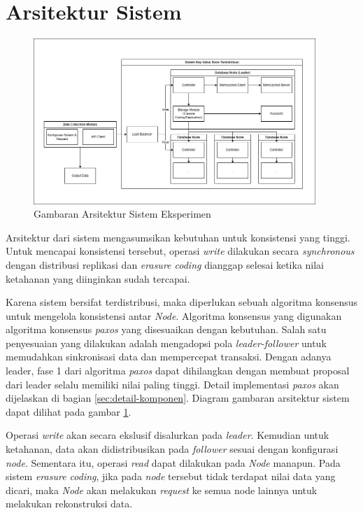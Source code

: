 \section{Arsitektur Sistem}
\label{sec:system-architecture}

\begin{figure}[ht]
    \centering
    \includegraphics[width=0.95\textwidth]{resources/chapter-3/general-architecture.png}
    \caption{Gambaran Arsitektur Sistem Eksperimen}
    \label{fig:general-architecture}
\end{figure}

Arsitektur dari sistem mengasumsikan kebutuhan untuk konsistensi yang tinggi. Untuk mencapai konsistensi tersebut, operasi \textit{write} dilakukan secara \textit{synchronous} dengan distribusi replikasi dan \textit{erasure coding} dianggap selesai ketika nilai ketahanan yang diinginkan sudah tercapai.

Karena sistem bersifat terdistribusi, maka diperlukan sebuah algoritma konsensus untuk mengelola konsistensi antar \textit{Node}. Algoritma konsensus yang digunakan algoritma konsensus \textit{paxos} yang disesuaikan dengan kebutuhan. Salah satu penyesuaian yang dilakukan adalah mengadopsi pola \textit{leader-follower} untuk memudahkan sinkronisasi data dan mempercepat transaksi. Dengan adanya leader, fase 1 dari algoritma \textit{paxos} dapat dihilangkan dengan membuat proposal dari leader selalu memiliki nilai paling tinggi. Detail implementasi \textit{paxos} akan dijelaskan di bagian \ref{sec:detail-komponen}. Diagram gambaran arsitektur sistem dapat dilihat pada gambar \ref{fig:general-architecture}.

Operasi \textit{write} akan secara ekslusif disalurkan pada \textit{leader}. Kemudian untuk ketahanan, data akan didistribusikan pada \textit{follower} sesuai dengan konfigurasi \textit{node}. Sementara itu, operasi \textit{read} dapat dilakukan pada \textit{Node} manapun. Pada sistem \textit{erasure coding}, jika pada \textit{node} tersebut tidak terdapat nilai data yang dicari, maka \textit{Node} akan melakukan \textit{request} ke semua node lainnya untuk melakukan rekonstruksi data.
